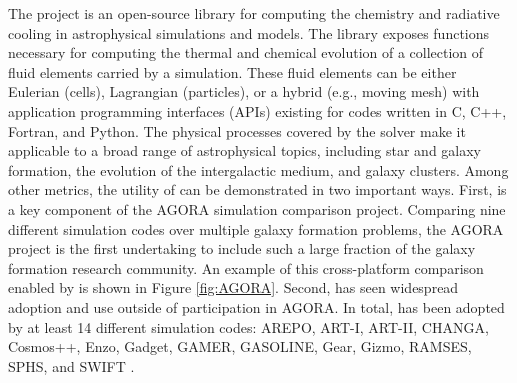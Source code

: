 The \grackle{} project
\citep[][\url{https://grackle.readthedocs.io}]{2017MNRAS.466.2217S} is
an open-source library for computing the chemistry and radiative
cooling in astrophysical simulations and models.  The
\grackle{} library exposes functions necessary for computing the
thermal and chemical evolution of a collection of fluid elements carried by a
simulation.  These fluid elements can be either Eulerian (cells),
Lagrangian (particles), or a hybrid (e.g., moving mesh) with
application programming interfaces (APIs)
existing for codes written in C, C++, Fortran, and Python.  The
physical processes covered by the solver make it applicable to a broad
range of astrophysical topics, including star and galaxy formation, the
evolution of the intergalactic medium, and galaxy clusters.  Among
other metrics, the utility of \grackle{} can be demonstrated in two
important ways.  First, \grackle{} is a key component of the AGORA
\citep{2014ApJS..210...14K, 2016ApJ...833..202K} simulation comparison
project.  Comparing nine different simulation codes over multiple
galaxy formation problems, the AGORA project is the first
undertaking to include such a large fraction of the galaxy formation research
community.  An example of this cross-platform comparison enabled by
\grackle{} is shown in Figure \ref{fig:AGORA}.  Second, \grackle{} has
seen widespread adoption and use outside of participation in AGORA.
In total, \grackle{} has been adopted by at least 14 different
simulation codes:
AREPO, ART-I, ART-II, CHANGA, Cosmos++, Enzo, Gadget, GAMER, GASOLINE, Gear,
Gizmo, RAMSES, SPHS, and SWIFT
\citep{2010MNRAS.401..791S, 1999PhDT........25K, 2002ApJ...571..563K,
2008ApJ...672...19R, 2004NewA....9..137W, 2006MNRAS.373.1074S,
2003ApJS..147..177A, 2005ApJ...635..723A, 2014ApJS..211...19B,
2005MNRAS.364.1105S, 2010ApJS..186..457S, 2004NewA....9..137W,
2012A&A...538A..82R, 2012ASPC..453..141R, 2015MNRAS.450...53H,
2002A&A...385..337T, 2012MNRAS.422.3037R, 2013arXiv1309.3783G,
2016arXiv160602738S}.

